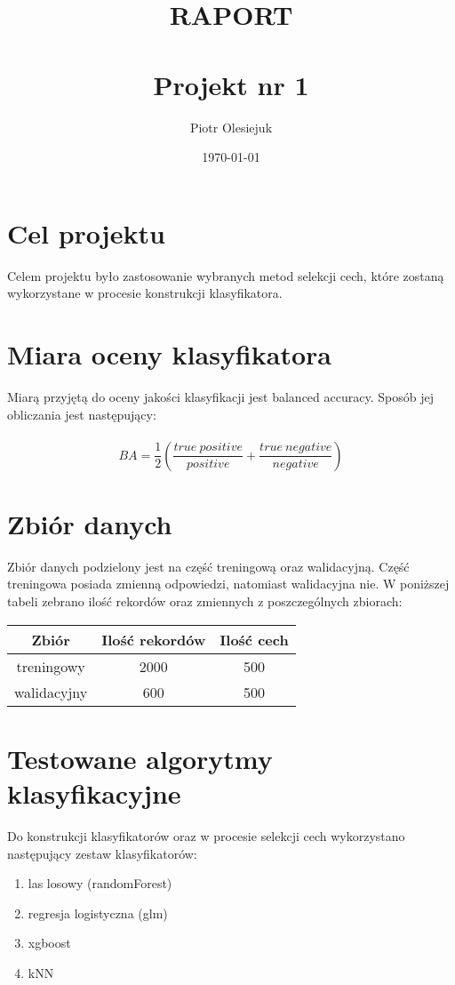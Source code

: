 \documentclass{article}
\title{RAPORT \\ \ \\ Projekt nr 1}
\author{Piotr Olesiejuk }
\date{\today}
\begin{document}
	\maketitle
\section{Cel projektu}
	Celem projektu było zastosowanie wybranych metod selekcji cech, które zostaną wykorzystane w procesie konstrukcji klasyfikatora.
\section{Miara oceny klasyfikatora}
Miarą przyjętą do oceny jakości klasyfikacji jest balanced accuracy. Sposób jej obliczania jest następujący: \\ \\
\begin{equation}
BA = \frac{1}{2}(\frac{true \ positive}{positive} + \frac{true \ negative}{negative}) 
\end{equation}

\section{Zbiór danych}

Zbiór danych podzielony jest na część treningową oraz walidacyjną. Część treningowa posiada zmienną odpowiedzi, natomiast walidacyjna nie. W poniższej tabeli zebrano ilość rekordów oraz zmiennych z poszczególnych zbiorach:

\begin{table}[H]
	\begin{center}
		\begin{tabular}{|c|c|c|}
			\hline
			Zbiór & Ilość rekordów & Ilość cech \\
			\hline
			treningowy & 2000 & 500 \\
			\hline
			walidacyjny & 600 & 500 \\
			\hline
		\end{tabular}
	\end{center}
\end{table}

\section{Testowane algorytmy klasyfikacyjne}
Do konstrukcji klasyfikatorów oraz w procesie selekcji cech wykorzystano następujący zestaw klasyfikatorów:
\begin{enumerate}
	\item las losowy (randomForest)
	\item regresja logistyczna (glm)
	\item xgboost
	\item kNN
\end{enumerate}
\end{document}
